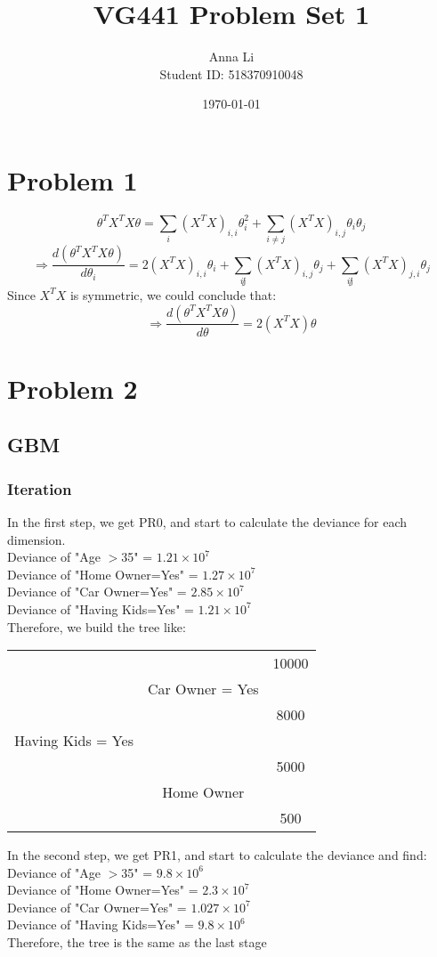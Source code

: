 \documentclass[a4paper,12pt]{journal}
\title{VG441 Problem Set 1}
\author{Anna Li \\Student ID: 518370910048}
\date{\today}
\begin{document}
	\maketitle
	\section*{Problem 1}
	$$\theta^TX^TX\theta=\sum_{i}(X^TX)_{i,i}\theta_i^2+\sum_{i\not =j}(X^TX)_{i,j}\theta_i\theta_j$$
	$$\Rightarrow \frac{d(\theta^TX^TX\theta)}{d\theta_i}=2(X^TX)_{i,i}\theta_i+\sum_{i\not j}(X^TX)_{i,j}\theta_j+\sum_{i\not j}(X^TX)_{j,i}\theta_j$$
	Since $X^TX$ is symmetric, we could conclude that:
	$$\Rightarrow \frac{d(\theta^TX^TX\theta)}{d\theta}=2(X^TX)\theta$$
	\section*{Problem 2}
	\subsection*{GBM}
	\subsubsection*{Iteration}
	In the first step, we get PR0, and start to calculate the deviance for each dimension. \\
	Deviance of "Age $>$35" = $1.21\times 10^7$\\
	Deviance of "Home Owner=Yes" = $1.27\times 10^7$\\
	Deviance of "Car Owner=Yes" = $2.85\times 10^7$\\
	Deviance of "Having Kids=Yes" = $1.21\times 10^7$\\
	Therefore, we build the tree like:
	\begin{center}
		\begin{tabular}{c c c}
			&&10000\\
			&Car Owner = Yes&\\
			&&8000\\
			Having Kids = Yes&&\\
			&&5000\\
			&Home Owner&\\
			&&500\\
		\end{tabular}
	\end{center}
	In the second step, we get PR1, and start to calculate the deviance and find:\\
	Deviance of "Age $>$35" = $9.8\times 10^6$\\
	Deviance of "Home Owner=Yes" = $2.3\times 10^7$\\
	Deviance of "Car Owner=Yes" = $1.027\times 10^7$\\
	Deviance of "Having Kids=Yes" = $9.8\times 10^6$\\
	Therefore, the tree is the same as the last stage\\
\end{document}
